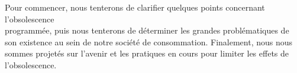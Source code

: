 \bigbreak Pour commencer, nous tenterons de clarifier quelques points concernant l'obsolescence\\ programmée, puis nous tenterons de déterminer les grandes problématiques de son existence au sein de notre société de consommation. Finalement, nous nous sommes projetés sur l'avenir et les pratiques en cours pour limiter les effets de l'obsolescence.



